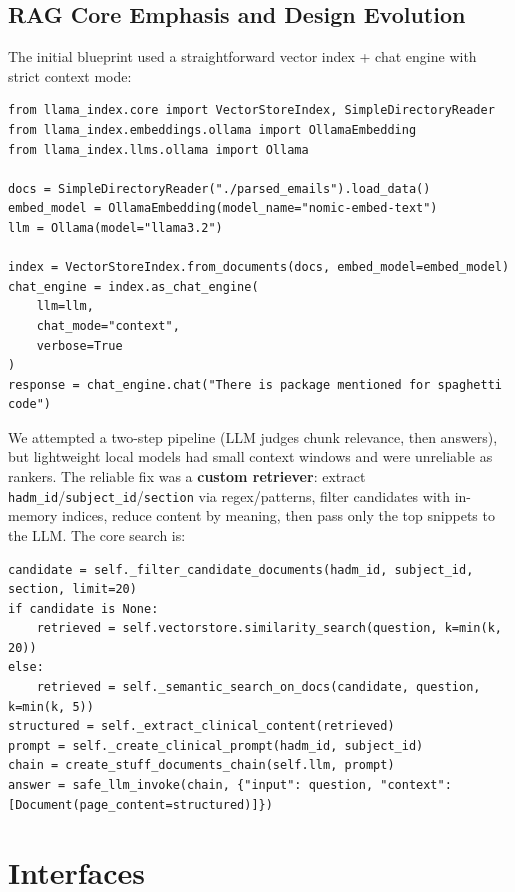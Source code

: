 \subsection{RAG Core Emphasis and Design Evolution}
The initial blueprint used a straightforward vector index + chat engine with strict context mode:
\begin{verbatim}
from llama_index.core import VectorStoreIndex, SimpleDirectoryReader
from llama_index.embeddings.ollama import OllamaEmbedding
from llama_index.llms.ollama import Ollama

docs = SimpleDirectoryReader("./parsed_emails").load_data()
embed_model = OllamaEmbedding(model_name="nomic-embed-text")
llm = Ollama(model="llama3.2")

index = VectorStoreIndex.from_documents(docs, embed_model=embed_model)
chat_engine = index.as_chat_engine(
    llm=llm,
    chat_mode="context",
    verbose=True
)
response = chat_engine.chat("There is package mentioned for spaghetti code")
\end{verbatim}

We attempted a two-step pipeline (LLM judges chunk relevance, then answers), but lightweight local models had small context windows and were unreliable as rankers. The reliable fix was a \textbf{custom retriever}: extract \texttt{hadm\_id}/\texttt{subject\_id}/\texttt{section} via regex/patterns, filter candidates with in-memory indices, reduce content by meaning, then pass only the top snippets to the LLM. The core search is:
\begin{verbatim}
candidate = self._filter_candidate_documents(hadm_id, subject_id, section, limit=20)
if candidate is None:
    retrieved = self.vectorstore.similarity_search(question, k=min(k, 20))
else:
    retrieved = self._semantic_search_on_docs(candidate, question, k=min(k, 5))
structured = self._extract_clinical_content(retrieved)
prompt = self._create_clinical_prompt(hadm_id, subject_id)
chain = create_stuff_documents_chain(self.llm, prompt)
answer = safe_llm_invoke(chain, {"input": question, "context": [Document(page_content=structured)]})
\end{verbatim}


\section{Interfaces}

